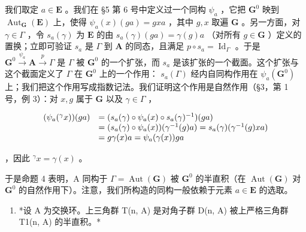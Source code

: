 我们取定 \(a \in \mathbf{E}\) 。我们在 §5 第 6 号中定义过一个同构 \(\psi_a\) ，它把 \(\mathbf{G}^0\) 映到 \(\operatorname{Aut}_{\mathbf{G}}(\mathbf{E})\) 上，使得 \(\psi_a(x)(ga) = gxa\) ，其中 \(g, x\) 取遍 \(\mathbf{G}\) 。另一方面，对 \(\gamma \in \Gamma\) ，令 \(s_a(\gamma)\) 为 \(\mathbf{E}\) 的由 \(s_a(\gamma)(ga) = \gamma(g)a\) （对所有 \(g \in \mathbf{G}\) ）定义的置换；立即可验证 \(s_a\) 是 \(\Gamma\) 到 \(\mathbf{A}\) 的同态，且满足 \(p \circ s_a = \operatorname{Id}_{\Gamma}\) 。于是 \(\mathbf{G}^0 \xrightarrow{\psi_a} \mathbf{A} \xrightarrow{p} \Gamma\) 是 \(\Gamma\) 被 \(\mathbf{G}^0\) 的一个扩张，而 \(s_a\) 是该扩张的一个截面。这个扩张与这个截面定义了 \(\Gamma\) 在 \(\mathbf{G}^0\) 上的一个作用： \(s_a(\Gamma)\) 经内自同构作用在 \(\psi_a(\mathbf{G}^0)\) 上；我们把这个作用写成指数记法。我们证明这个作用是自然作用（§3，第 1 号，例 3）：对 \(x, g\) 属于 \(\mathbf{G}\) 以及 \(\gamma \in \Gamma\) ，

\[
\begin{array}{r l} (\psi_ {a} (^ {\gamma} x)) (g a) & = (s _ {a} (\gamma) \circ \psi_ {a} (x) \circ s _ {a} (\gamma) ^ {- 1}) (g a) \\ & = (s _ {a} (\gamma) \circ \psi_ {a} (x)) (\gamma^ {- 1} (g) a) = s _ {a} (\gamma) (\gamma^ {- 1} (g) x a) \\ & = g \gamma (x) a = \psi_ {a} (\gamma (x)) g a \end{array}
\]

，因此 \({}^{\gamma}x = \gamma(x)\) 。

于是命题 4 表明，A 同构于 \(\Gamma = \operatorname{Aut}(\mathbf{G})\) 被 \(\mathbf{G}^0\) 的半直积（在 \(\operatorname{Aut}(\mathbf{G})\) 对 \(\mathbf{G}^0\) 的自然作用下）。注意，我们所构造的同构一般依赖于元素 \(a \in \mathbf{E}\) 的选取。

\begin{enumerate}
\def\labelenumi{(\arabic{enumi})}
\setcounter{enumi}{1}
\tightlist
\item
  *设 A 为交换环。上三角群 T(n, A) 是对角子群 D(n, A) 被上严格三角群 T1(n, A) 的半直积。*
\end{enumerate}

